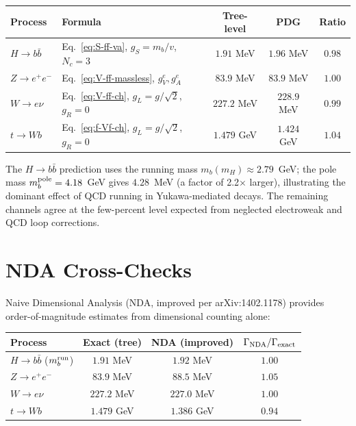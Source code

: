 \documentclass[11pt,a4paper]{article}
\begin{document}
\begin{center}
\begin{tabular}{llccc}
\toprule
Process & Formula & Tree-level & PDG & Ratio \\
\midrule
$H\to b\bar{b}$ & Eq.~\eqref{eq:S-ff-va}, $g_S=m_b/v$, $N_c=3$
  & $1.91$ MeV & $1.96$ MeV & $0.98$ \\
$Z\to e^+e^-$ & Eq.~\eqref{eq:V-ff-massless}, $g_V^e, g_A^e$
  & $83.9$ MeV & $83.9$ MeV & $1.00$ \\
$W\to e\nu$ & Eq.~\eqref{eq:V-ff-ch}, $g_L=g/\sqrt{2}$, $g_R=0$
  & $227.2$ MeV & $228.9$ MeV & $0.99$ \\
$t\to Wb$ & Eq.~\eqref{eq:f-Vf-ch}, $g_L=g/\sqrt{2}$, $g_R=0$
  & $1.479$ GeV & $1.424$ GeV & $1.04$ \\
\bottomrule
\end{tabular}
\end{center}

The $H\to b\bar{b}$ prediction uses the running mass $m_b(m_H) \approx 2.79$~GeV; the pole mass
$m_b^{\rm pole} = 4.18$~GeV gives $4.28$~MeV (a factor of 2.2$\times$ larger), illustrating
the dominant effect of QCD running in Yukawa-mediated decays. The remaining channels agree at
the few-percent level expected from neglected electroweak and QCD loop corrections.

\section{NDA Cross-Checks}
\label{sec:nda}

Naive Dimensional Analysis (NDA, improved per arXiv:1402.1178) provides order-of-magnitude
estimates from dimensional counting alone:

\begin{center}
\begin{tabular}{lccc}
\toprule
Process & Exact (tree) & NDA (improved) & $\Gamma_{\rm NDA}/\Gamma_{\rm exact}$ \\
\midrule
$H\to b\bar{b}$ ($m_b^{\rm run}$) & $1.91$ MeV & $1.92$ MeV & $1.00$ \\
$Z\to e^+e^-$ & $83.9$ MeV & $88.5$ MeV & $1.05$ \\
$W\to e\nu$ & $227.2$ MeV & $227.0$ MeV & $1.00$ \\
$t\to Wb$ & $1.479$ GeV & $1.386$ GeV & $0.94$ \\
\bottomrule
\end{tabular}
\end{center}
\end{document}
